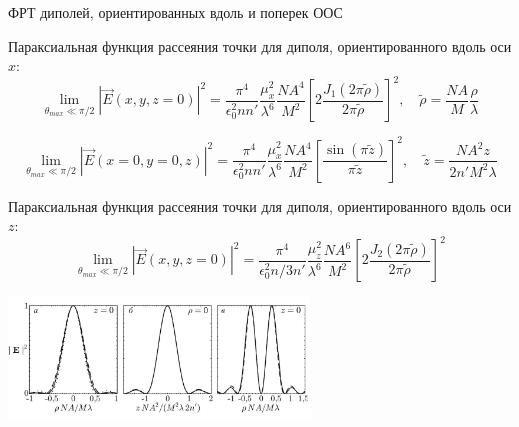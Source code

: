 \documentclass[9pt, compress, xcolor=table]{beamer}
\begin{document}
\begin{frame}{ФРТ диполей, ориентированных вдоль и поперек ООС}

{\small Параксиальная функция рассеяния точки для
диполя, ориентированного вдоль оси $x$:}
\begin{equation*}
\lim_{\theta_{max} \ll \pi/2} |\vec E(x,y,z =0)|^2
= \frac{\pi^4}{\epsilon_0^2 n n'} \frac{\mu_x^2}{\lambda^6} \frac{NA^4}{M^2}
\left[2 \frac{J_1 (2 \pi \tilde{\rho})}{2 \pi \tilde{\rho}}\right]^2,
\quad \tilde{\rho} = \frac{NA}{M}\frac{\rho}{\lambda}
\end{equation*}

\begin{equation*}
\lim_{\theta_{max} \ll \pi/2} |\vec E(x = 0, y = 0, z)|^2 = \frac{\pi^4}{\epsilon_0^2 n n'} \frac{\mu_x^2}{\lambda^6}
\frac{NA^4}{M^2}\left[\frac{\sin (\pi \tilde{z})}{\pi \tilde{z}}\right]^2, \quad \tilde{z} = \frac{NA^2 z}{2n'M^2 \lambda}
\end{equation*}

{\small Параксиальная функция рассеяния точки для
диполя, ориентированного вдоль оси $z$:}
\begin{equation*}
\lim_{\theta_{max} \ll \pi/2} |\vec E(x,y,z =0)|^2 = \frac{\pi^4}{\epsilon_0^2 n/3 n'} \frac{\mu_z^2}{\lambda^6} \frac{NA^6}{M^2}
\left[2 \frac{J_2 (2 \pi \tilde{\rho})}{2 \pi \tilde{\rho}}\right]^2
\end{equation*}
\begin{center}
\includegraphics[width=0.6\textwidth]{fig4_02}
\end{center}

\end{frame}
\end{document}
